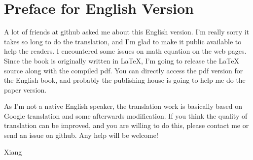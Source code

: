 \chapter*{Preface for English Version}
A lot of friends at github asked me about this English version. I'm really sorry it takes so long to do the translation, and I'm glad to make it public available to help the readers. I encountered some issues on math equation on the web pages. Since the book is originally written in LaTeX, I'm going to release the LaTeX source along with the compiled pdf. You can directly access the pdf version for the English book, and probably the publishing house is going to help me do the paper version.

As I'm not a native English speaker, the translation work is basically based on Google translation and some afterwards modification. If you think the quality of translation can be improved, and you are willing to do this, please contact me or send an issue on github. Any help will be welcome!

Xiang